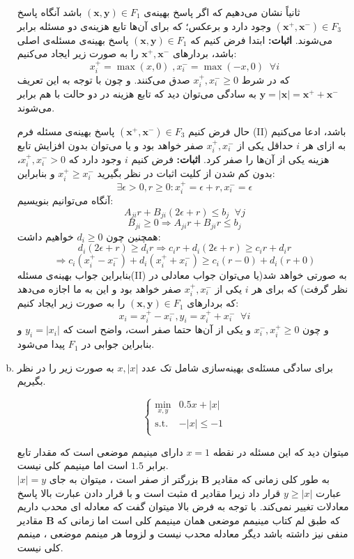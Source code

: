 \documentclass[12pt]{article}
\begin{document}
\begin{enumerate}[(a)]
ثانياً نشان می‌دهیم که اگر پاسخ بهینه‌‌‌ی 
$(\mathbf{x}, \mathbf{y})  \in F_1$ 
باشد آنگاه پاسخ 
$(\mathbf{x}^+, \mathbf{x}^-)  \in F_3$ 
وجود دارد و برعکس؛ که برای آن‌ها تابع هزینه‌ی دو مسئله برابر می‌شوند. 
\textbf{اثبات:}
ابتدا فرض کنیم که 
$(\mathbf{x}, \mathbf{y})  \in F_1$ 
پاسخ بهینه‌ی مسئله‌ی اصلی باشد،
بردارهای 
$\mathbf{x^+}, \mathbf{x^-}$
را به صورت زیر ایجاد می‌کنیم:
$$ x_i^+= \max(x, 0) \; , x_i^-=\max(-x, 0) \; \; \forall i$$
که در شرط 
$x_i^+ , x_i^- \geq 0$
صدق می‌کنند. و چون با توجه به این تعریف 
$\mathbf{y} = |\mathbf{x}| =  \mathbf{x^+} + \mathbf{x^-}$
به سادگی می‌توان دید که تابع هزینه در دو حالت با هم برابر می‌شوند.

حال فرض کنیم 
$(\mathbf{x}^+, \mathbf{x}^-)  \in F_3$  
پاسخ بهینه‌ی مسئله فرم (II) باشد، ادعا می‌کنیم به‌ ازای هر $i$ حداقل یکی از 
$x_i^+, x_i^-$
صفر خواهد بود و یا می‌توان بدون افزایش تابع هزینه یکی از آن‌ها را صفر کرد. \textbf{اثبات:}
فرض کنیم $i$ وجود دارد که $x_i^+ , x_i^- > 0$، بدون کم شدن از کلیت اثبات در نظر بگیرید 
 $x_i^+ \ge x_i^-$
 و بنابراین:
	$$ \exists \epsilon > 0, r \ge 0 : x_i^+ = \epsilon + r, x_i^- = \epsilon $$
	آنگاه می‌توانیم بنویسیم:
	$$A_{ji}r + B_{ji}(2\epsilon + r) \le b_j \; \; \forall j$$ 
	$$ B_{ji} \ge 0 \Rightarrow A_{ji}r + B_{ji}r \le b_j$$
	همچنین چون
	 $d_i \ge 0$
	 خواهیم داشت:
	 $$ d_i(2\epsilon + r) \ge d_ir \Rightarrow 
	 c_ir + d_i(2\epsilon + r) \ge c_ir + d_ir $$
	 $$ \Rightarrow c_i(x_i^+ - x_i^-) + d_i(x_i^+ + x_i^-) \ge c_i(r - 0) + d_i (r + 0) $$ 
	 بنابراین جواب بهینه‌ی مسئله‌(II) به صورتی خواهد شد(یا می‌توان جواب معادلی در نظر گرفت) که برای هر $i$ یکی از $x_i^+, x_i^-$ صفر خواهد بود و این به ما اجازه می‌دهد که بردارهای 
	 $(\mathbf{x}, \mathbf{y}) \in F_1$
	 را به صورت زیر ایجاد کنیم:
	 $$ x_i = x_i^+ - x_i^- , y_i = x_i^+ + x_i^- \; \; \forall i $$
	 و چون 
	 $x_i^-, x_i^+ \ge 0$
	 و یکی از آن‌ها حتما صفر است، واضح است که 
	 $y_i = |x_i|$
	 و بنابراین جوابی در 
	 $F_1$
	 پیدا می‌شود.
	\item
برای سادگی مسئله‌ی بهینه‌سازی شامل تک عدد $x, |x|$ به صورت زیر را در نظر بگیریم. 

\begin{equation*}
	\left\{
	\begin{array}{cll}
		\min_{x,y} &  0.5 x + |x| \\
		\mathrm{s.t.} & -|x| \le -1\\
	\end{array}  \right.
\end{equation*}

میتوان دید که این مسئله در نقطه 
$x=1$
دارای مینیمم موضعی است که مقدار تابع برابر $1.5$ است اما مینیمم کلی نیست. 
\\
به طور کلی زمانی که مقادیر $\mathbf{B}$ بزرگتر از صفر است ، میتوان به جای 
$|x|=y$
عبارت 
$y\geq |x|$
قرار داد زیرا مقادیر 
$\mathbf{d}$ 
مثبت است و با قرار دادن عبارت بالا پاسخ معادلات تغییر نمی‌کند. با توجه به فرض بالا میتوان گفت که معادله ای محدب داریم که طبق لم کتاب مینیمم موضعی همان مینیمم کلی است اما زمانی که $\mathbf{B}$ مقادیر منفی نیز داشته باشد دیگر معادله محدب نیست و لزوما هر مینمم موضعی ، مینمم کلی نیست.
\\
\end{enumerate}
\end{document}
